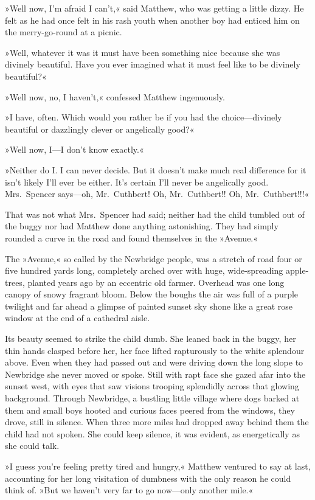 »Well now, I'm afraid I can't,« said Matthew, who was getting a little dizzy. He felt as he had once felt in his rash youth when another boy had enticed him on the merry-go-round at a picnic.

»Well, whatever it was it must have been something nice because she was divinely beautiful. Have you ever imagined what it must feel like to be divinely beautiful?«

»Well now, no, I haven't,« confessed Matthew ingenuously.

»I have, often. Which would you rather be if you had the choice—divinely beautiful or dazzlingly clever or angelically good?«

»Well now, I—I don't know exactly.«

»Neither do I. I can never decide. But it doesn't make much real difference for it isn't likely I'll ever be either. It's certain I'll never be angelically good. Mrs.~Spencer says—oh, Mr.~Cuthbert! Oh, Mr.~Cuthbert!! Oh, Mr.~Cuthbert!!!«

That was not what Mrs.~Spencer had said; neither had the child tumbled out of the buggy nor had Matthew done anything astonishing. They had simply rounded a curve in the road and found themselves in the »Avenue.«

The »Avenue,« so called by the Newbridge people, was a stretch of road four or five hundred yards long, completely arched over with huge, wide-spreading apple-trees, planted years ago by an eccentric old farmer. Overhead was one long canopy of snowy fragrant bloom. Below the boughs the air was full of a purple twilight and far ahead a glimpse of painted sunset sky shone like a great rose window at the end of a cathedral aisle.

Its beauty seemed to strike the child dumb. She leaned back in the buggy, her thin hands clasped before her, her face lifted rapturously to the white splendour above. Even when they had passed out and were driving down the long slope to Newbridge she never moved or spoke. Still with rapt face she gazed afar into the sunset west, with eyes that saw visions trooping splendidly across that glowing background. Through Newbridge, a bustling little village where dogs barked at them and small boys hooted and curious faces peered from the windows, they drove, still in silence. When three more miles had dropped away behind them the child had not spoken. She could keep silence, it was evident, as energetically as she could talk.

»I guess you're feeling pretty tired and hungry,« Matthew ventured to say at last, accounting for her long visitation of dumbness with the only reason he could think of. »But we haven't very far to go now—only another mile.«

